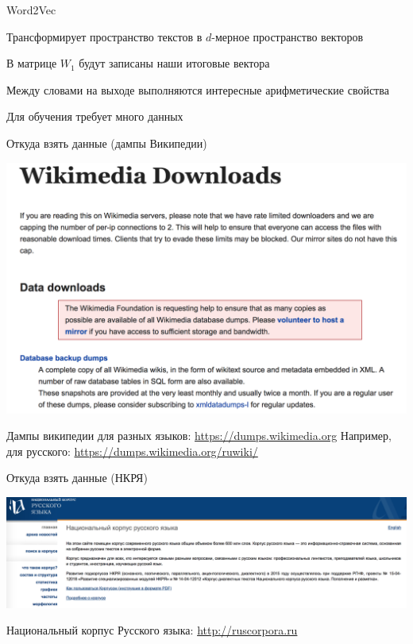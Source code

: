\documentclass[notes,12pt, aspectratio=169]{beamer}
\newenvironment{wideitemize}{\itemize\addtolength{\itemsep}{10pt}}{\enditemize}
\begin{document}
\begin{frame}{Word2Vec}
\begin{wideitemize} 
	\item  Трансформирует пространство текстов в $d$-мерное пространство векторов
	\item  В матрице $W_1$ будут записаны наши итоговые вектора
	\item  Между словами на выходе выполняются интересные арифметические свойства 
	\item  Для обучения требует много данных 
\end{wideitemize} 
\end{frame} 


\begin{frame}{Откуда взять данные (дампы Википедии)}
\begin{center}
\includegraphics[width=.7\linewidth]{wiki_dumps.png}
\end{center}

\vfill

\footnotesize Дампы википедии для разных языков:  {\color{blue} \url{https://dumps.wikimedia.org}} \newline Например, для русского:  {\color{blue} \url{https://dumps.wikimedia.org/ruwiki/}} 
\end{frame} 


\begin{frame}{Откуда взять данные (НКРЯ)}
\begin{center}
\includegraphics[width=.99\linewidth]{ruscorp.png}
\end{center}

\vfill

\footnotesize Национальный корпус Русского языка:  {\color{blue} \url{http://ruscorpora.ru}} 
\end{frame} 
\end{document}
